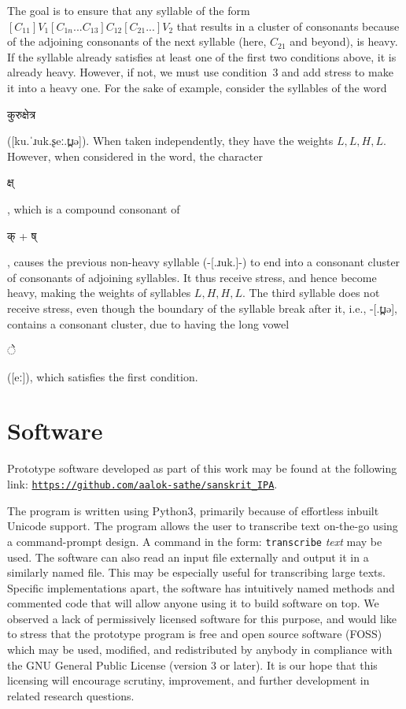 \documentclass[10pt,a4paper]{article}
\newcommand{\sansk}[1]{\begin{sanskrit}#1\end{sanskrit}}
\begin{document}
The goal is to ensure that any syllable of the form $[C_{11}]V_1[C_{1n}...C_{13}]C_{12}[C_{21}...]V_2$ that results in a cluster of consonants because of the adjoining consonants of the next syllable (here, $C_{21}$ and beyond), is heavy. If the syllable already satisfies at least one of the first two conditions above, it is already heavy. However, if not, we must use condition~3 and add stress to make it into a heavy one.
For the sake of example, consider the syllables of the word \sansk{कुरु{क्षे}त्र} ([ku.ˈɹuk.ʂeː.t̪ɹə]). When taken independently, they have the weights $L,L,H,L$. However, when considered in the word, the character \sansk{क्ष्}, which is a compound consonant of \sansk{क् + ष्}, causes the previous non-heavy syllable (-[.ɹuk.]-) to end into a consonant cluster of consonants of adjoining syllables. It thus receive stress, and hence become heavy, making the weights of syllables $L,H,H,L$. The third syllable does not receive stress, even though the boundary of the syllable break after it, i.e., -[.t̪ɹə], contains a consonant cluster, due to having the long vowel \sansk{े} ([eː]), which satisfies the first condition.

\vspace{.3\baselineskip}

\section{Software}
Prototype software developed as part of this work may be found at the following link:
\hyperref{https://github.com/aalok-sathe/sanskrit_IPA}{}{}{\tt https://github.com/aalok-sathe/sanskrit\_IPA}.

The program is written using Python3, primarily because of effortless inbuilt Unicode support. The program allows the user to transcribe text on-the-go using a command-prompt design. A command in the form: \texttt{transcribe} \textsl{text} may be used. The software can also read an input file externally and output it in a similarly named file. This may be especially useful for transcribing large texts. Specific implementations apart, the software has intuitively named methods and commented code that will allow anyone using it to build software on top.
We observed a lack of permissively licensed software for this purpose, and would like to stress that the prototype program is free and open source software (FOSS) which may be used, modified, and redistributed by anybody in compliance with the GNU General Public License (version 3 or later). It is our hope that this licensing will encourage scrutiny, improvement, and further development in related research questions.
\end{document}
